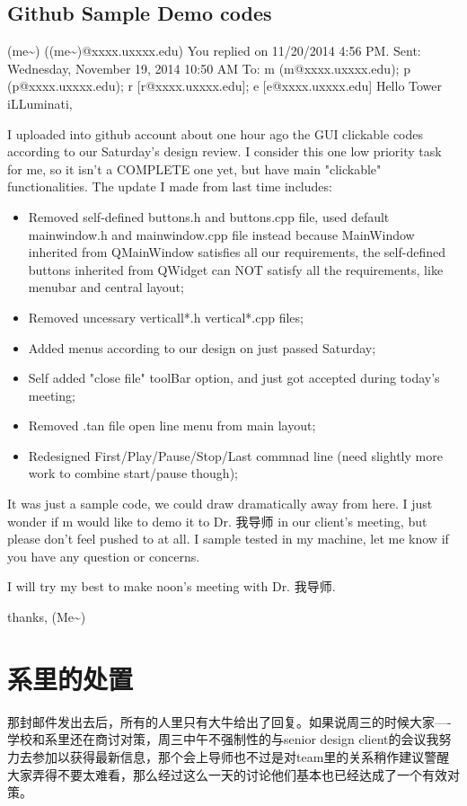 \documentclass[12pt]{book}
\begin{document}
\section{Github Sample Demo codes}
\label{sec-31-2}
(me\textasciitilde{}) ((me\textasciitilde{})@xxxx.uxxxx.edu)
You replied on 11/20/2014 4:56 PM.
Sent:        Wednesday, November 19, 2014 10:50 AM
To:        
m (m@xxxx.uxxxx.edu); p (p@xxxx.uxxxx.edu); r [r@xxxx.uxxxx.edu]; e [e@xxxx.uxxxx.edu]
Hello Tower iLLuminati, 

I uploaded into github account about one hour ago the GUI clickable codes according to our Saturday's design review. I consider this one low priority task for me, so it isn't a COMPLETE one yet, but have main "clickable" functionalities. The update I made from last time includes: 

\begin{itemize}
\item Removed self-defined buttons.h and buttons.cpp file, used default mainwindow.h and mainwindow.cpp file instead because MainWindow inherited from QMainWindow satisfies all our requirements, the self-defined buttons inherited from QWidget can NOT satisfy all the requirements, like menubar and central layout;
\item Removed uncessary verticall*.h vertical*.cpp files;
\item Added menus according to our design on just passed Saturday;
\item Self added "close file" toolBar option, and just got accepted during today's meeting;
\item Removed .tan file open line menu from main layout;
\item Redesigned First/Play/Pause/Stop/Last commnad line (need slightly more work to combine start/pause though);
\end{itemize}

It was just a sample code, we could draw dramatically away from here. I just wonder if m would like to demo it to Dr. 我导师 in our client's meeting, but please don't feel pushed to at all. I sample tested in my machine, let me know if you have any question or concerns. 

I will try my best to make noon's meeting with Dr. 我导师. 

thanks,
(Me\textasciitilde{})
\chapter{系里的处置}
\label{sec-32}
那封邮件发出去后，所有的人里只有大牛给出了回复。如果说周三的时候大家----学校和系里还在商讨对策，周三中午不强制性的与senior design client的会议我努力去参加以获得最新信息，那个会上导师也不过是对team里的关系稍作建议警醒大家弄得不要太难看，那么经过这么一天的讨论他们基本也已经达成了一个有效对策。
\end{document}
